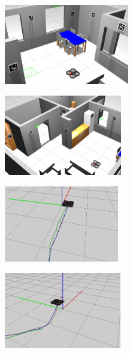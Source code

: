 \documentclass[notes,slidesec,a4]{seminar}
\begin{document}
\begin{hslide}

\begin{center}
	\begin{figure}
		\centering
		\begin{subfigure}
			\centering
			\includegraphics[width=5.45cm]{img/pisogazebo}
		\end{subfigure}%
		\begin{subfigure}
			\centering
			\includegraphics[width=5.12cm]{img/pisogazebo2}
		\end{subfigure}
	\end{figure}
\end{center}

\end{hslide}

\begin{hslide}

\begin{center}
	\begin{figure}
		\centering
		\begin{subfigure}
			\centering
			\includegraphics[width=5cm]{img/testlinearecta}
		\end{subfigure}%
		\begin{subfigure}
			\centering
			\includegraphics[width=5.1cm]{img/rutacambiosaltura}
		\end{subfigure}
	\end{figure}
\end{center}

\end{hslide}
\end{document}
